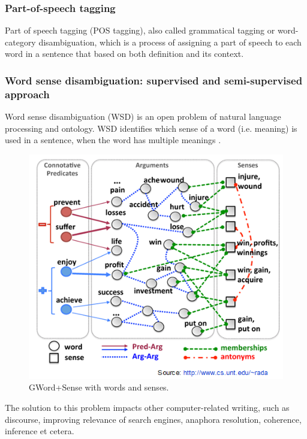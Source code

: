 \subsubsection*{Part-of-speech tagging}

Part of speech tagging (POS tagging), also called grammatical tagging or word-category disambiguation, which is a process of assigning a part of speech to each word in a sentence that based on both definition and its context.\\

\subsubsection*{Word sense disambiguation: supervised and semi-supervised approach}

Word sense disambiguation (WSD) is an open problem of natural language processing and ontology. WSD identifies which sense of a word (i.e. meaning) is used in a sentence, when the word has multiple meanings \cite{Du2013}. 

\begin{figure}[tbh]
	\begin{center}
		\includegraphics[width=\columnwidth]{Union_Background_Chart_WSD}
	\end{center}
	\caption{GWord+Sense with words and senses. \label{fig1}}
\end{figure}

The solution to this problem impacts other computer-related writing, such as discourse, improving relevance of search engines, anaphora resolution, coherence, inference et cetera.

